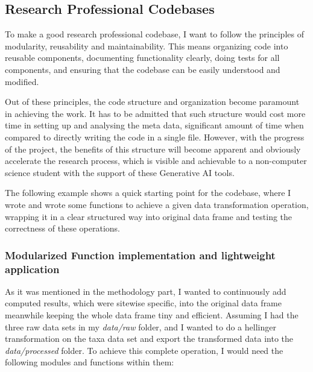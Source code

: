 \subsection{Research Professional Codebases}
To make a good research professional codebase, I want to follow the principles of modularity, reusability and maintainability.
This means organizing code into reusable components, documenting functionality clearly, 
doing tests for all components, and ensuring that the codebase can be easily understood and modified.

Out of these principles, the code structure and organization become paramount in achieving the work.
It has to be admitted that such structure would cost more time in setting up and analysing 
the meta data, significant amount of time when compared to directly writing the code in a single 
file. However, with the progress of the project, the benefits of this structure will become apparent
and obviously accelerate the research process, which is visible and achievable to
a non-computer science student with the support of these Generative AI tools.

The following example shows a quick starting point for the codebase, where I wrote
and wrote some functions to achieve a given data transformation operation, wrapping
it in a clear structured way into original data frame and testing the correctness 
of these operations. 

\subsubsection{Modularized Function implementation and lightweight application}

As it was mentioned in the methodology part, I wanted to continuously add computed 
results, which were sitewise specific, into the original data frame meanwhile
keeping the whole data frame tiny and efficient. Assuming I had the three raw data sets in my
\textit{data/raw} folder, and I wanted to do a hellinger transformation on the
taxa data set and export the transformed data into the \textit{data/processed} folder.
To achieve this complete operation, I would need the following modules and functions within them:

